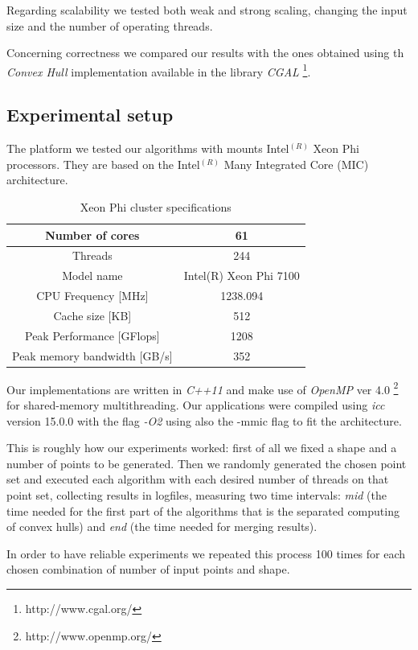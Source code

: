 \documentclass[letterpaper]{article}
\theoremstyle{definition}
\begin{document}
Regarding scalability we tested both weak and strong scaling, changing the input size and the number of operating threads.

Concerning correctness we compared our results with the ones obtained using th \textit{Convex Hull} implementation available in the library \textit{CGAL} \footnote{http://www.cgal.org/}.

\subsection{Experimental setup}

The platform we tested our algorithms with mounts Intel$^{(R)}$ Xeon Phi processors. They are based on the Intel$^{(R)}$ Many Integrated Core (MIC) architecture.

\begin{table}[!ht]
\begin{tabular}{|c|c|}
\hline Number of cores			& 61\\
\hline Threads					& 244\\
\hline Model name				& Intel(R) Xeon Phi 7100\\
\hline CPU Frequency [MHz]		& 1238.094\\
\hline Cache size [KB]			& 512\\
\hline Peak Performance [GFlops]	& 1208\\
\hline Peak memory bandwidth [GB/s]		& 352\\
\hline
\end{tabular}
\caption{Xeon Phi cluster specifications}
\end{table}

Our implementations are written in \textit{C++11} and make use of \textit{OpenMP} ver 4.0 \footnote{http://www.openmp.org/} for shared-memory multithreading.
Our applications were compiled using \textit{icc} version 15.0.0 with the flag \textit{-O2} using also the -mmic flag to fit the architecture.

This is roughly how our experiments worked:
first of all we fixed a shape and a number of points to be generated. Then we randomly generated the chosen point set and executed each algorithm with each desired number of threads on that point set, collecting results in logfiles, measuring two time intervals: \textit{mid} (the time needed for the first part of the algorithms that is the separated computing of convex hulls) and \textit{end} (the time needed for merging results).

In order to have reliable experiments we repeated this process 100 times for each chosen combination of number of input points and shape.
\end{document}
